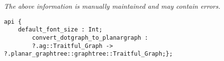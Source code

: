 \label{api:Dotgraph\_To\_Planargraph}

{\tiny \it The above information is manually maintained and may contain errors.}
\begin{verbatim}
api {
    default_font_size : Int;
        convert_dotgraph_to_planargraph :
        ?.ag::Traitful_Graph -> ?.planar_graphtree::graphtree::Traitful_Graph;};
\end{verbatim}
